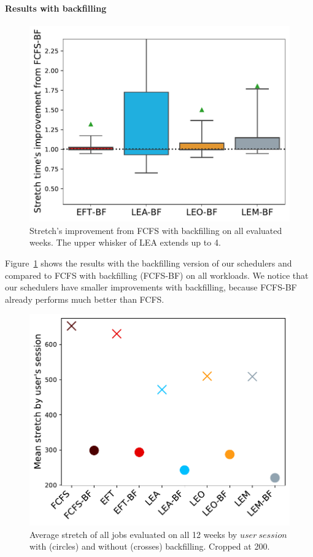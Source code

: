 \documentclass[conference]{IEEEtran}
\newcommand{\us}{\ensuremath{\mathit{user~session}}\xspace}
\begin{document}
\paragraph{Results with backfilling}
\begin{figure}[t]\centering\includegraphics[width=0.9\linewidth]{../MBSS/plot/Boxplot/byuser/box_plot_bf_stretch_all-all_1.pdf}\caption{Stretch's improvement from FCFS with backfilling on all evaluated weeks. The upper whisker of LEA extends up to 4.}\label{boxplot.all_bf}\end{figure}
Figure~\ref{boxplot.all_bf} shows the results with the backfilling version of our
schedulers and compared to FCFS with backfilling (FCFS-BF) on all workloads.
We notice that our schedulers have smaller improvements with
backfilling, because FCFS-BF already performs much better than FCFS.
\begin{figure}[t]\centering\includegraphics[width=0.9\linewidth]{../MBSS/plot/byuser/Mean_stretch_with_and_without_bf_all-all.pdf}\caption{Average stretch of all jobs evaluated on all 12 weeks by \us with (circles) and without (crosses) backfilling. Cropped at 200.}\label{bf_vs_non_bf}\end{figure}
\end{document}

